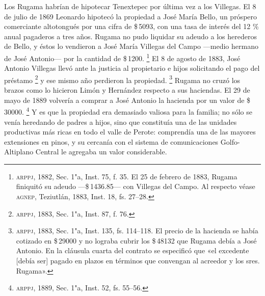 \documentclass[14pt,twoside,final]{extbook} %
\let\oldfootnote\footnote
\renewcommand\footnote[1]{%
\oldfootnote{\hspace{1mm}#1}}
\begin{document}
Los Rugama habrían de hipotecar Tenextepec por última vez a los Villegas. El 8 de julio de 1869 Leonardo hipotecó la propiedad a José María Bello, un próspero comerciante altotongués por una cifra de \$\,5093, con una tasa de interés del 12 \% anual pagaderos a tres años. Rugama no pudo liquidar su adeudo a los herederos de Bello, y éstos lo vendieron a José María Villegas del Campo ---medio hermano de José Antonio--- por la cantidad de \$\,1200.\footnote{\textsc{arppj}, 1882, Sec. 1"a, Inst. 75, f. 35. El 25 de febrero de 1883, Rugama finiquitó su adeudo ---\$\,1436.85--- con Villegas del Campo. Al respecto véase \textsc{agnep}, Teziutlán, 1883, Inst. 18, fs. 27--28.} El 8 de agosto de 1883, José Antonio Villegas llevó ante la justicia al propietario e hijos solicitando el pago del préstamo\footnote{\textsc{arppj}, 1883, Sec. 1"a, Inst. 87, f. 76.} y ese mismo año perdieron la propiedad.\footnote{\textsc{arppj}, 1883, Sec. 1"a, Inst. 135, fs. 114--118. El precio de la hacienda se había cotizado en \$\,29000 y no lograba cubrir los \$\,48132 que Rugama debía a José Antonio. En la cláusula cuarta del contrato se especificó que «el excedente [debía ser] pagado en plazos en términos que convengan al acreedor y los sres. Rugama».} Rugama no cruzó los brazos como lo hicieron Limón y Hernández respecto a sus haciendas. El 29 de mayo de 1889 volvería a comprar a José Antonio la hacienda por un valor de \$\,30000.\footnote{\textsc{arppj}, 1889, Sec. 1"a, Inst. 52, fs. 55--56.} Y es que la propiedad era demasiado valiosa para la familia; no sólo se venía heredando de padres a hijos, sino que constituía una de las unidades productivas más ricas en todo el valle de Perote: comprendía una de las mayores extensiones en pinos, y su cercanía con el sistema de comunicaciones Golfo-Altiplano Central le agregaba un valor considerable.
\end{document}
